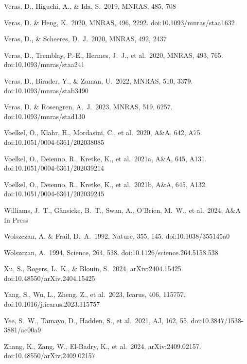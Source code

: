 \documentclass[useAMS,usenatbib]{mn2e}
\begin{document}
\begin{thebibliography}{99}
 Veras, D., Higuchi, A., \& Ida, S.\ 2019, MNRAS, 485, 708

 Veras, D. \& Heng, K.\ 2020, MNRAS, 496, 2292. doi:10.1093/mnras/staa1632

 Veras, D., \& Scheeres, D.~J.\ 2020, MNRAS, 492, 2437

 Veras, D., Tremblay, P.-E., Hermes, J.~J., et al.\ 2020, MNRAS, 493, 765. doi:10.1093/mnras/staa241

 Veras, D., Birader, Y., \& Zaman, U.\ 2022, MNRAS, 510, 3379. doi:10.1093/mnras/stab3490

 Veras, D. \& Rosengren, A.~J.\ 2023, MNRAS, 519, 6257. doi:10.1093/mnras/stad130

 Voelkel, O., Klahr, H., Mordasini, C., et al.\ 2020, A\&A, 642, A75. doi:10.1051/0004-6361/202038085

 Voelkel, O., Deienno, R., Kretke, K., et al.\ 2021a, A\&A, 645, A131. doi:10.1051/0004-6361/202039214

 Voelkel, O., Deienno, R., Kretke, K., et al.\ 2021b, A\&A, 645, A132. doi:10.1051/0004-6361/202039245

 Williams, J.~T., G\"{a}nsicke, B.~T., Swan, A., O'Brien, M.~W., et al.\ 2024, A\&A In Press

 Wolszczan, A. \& Frail, D.~A.\ 1992, Nature, 355, 145. doi:10.1038/355145a0

 Wolszczan, A.\ 1994, Science, 264, 538. doi:10.1126/science.264.5158.538

 Xu, S., Rogers, L.~K., \& Blouin, S.\ 2024, arXiv:2404.15425. doi:10.48550/arXiv.2404.15425

 Yang, S., Wu, L., Zheng, Z., et al.\ 2023, Icarus, 406, 115757. doi:10.1016/j.icarus.2023.115757

 Yee, S.~W., Tamayo, D., Hadden, S., et al.\ 2021, AJ, 162, 55. doi:10.3847/1538-3881/ac00a9

 Zhang, K., Zang, W., El-Badry, K., et al.\ 2024, arXiv:2409.02157. doi:10.48550/arXiv.2409.02157


\end{thebibliography}
\end{document}
